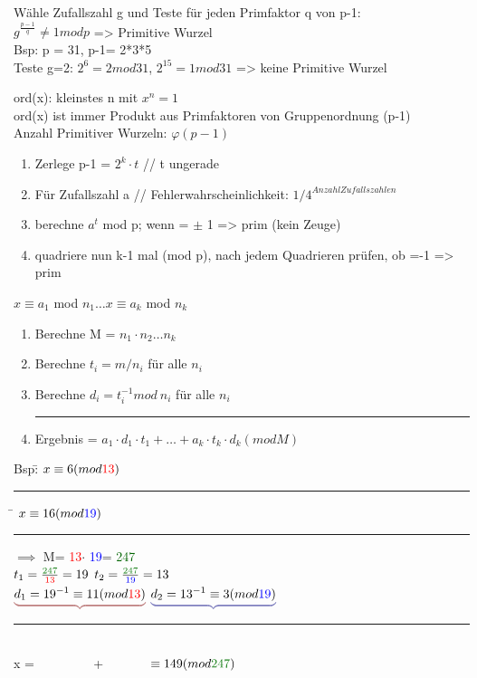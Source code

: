 Wähle Zufallszahl g und Teste für jeden Primfaktor q von p-1: \\
$g^{\frac{p-1}{q}} \neq 1 mod p$ => Primitive Wurzel\\
Bsp: p = 31, p-1= 2*3*5\\
Teste g=2:  $2^6 =2 mod 31$, $2^{15} =1 mod 31$ => keine Primitive Wurzel

ord(x): kleinstes n mit $x^n=1$\\
ord(x) ist immer Produkt aus Primfaktoren von Gruppenordnung (p-1)\\
Anzahl Primitiver Wurzeln: $\varphi(p-1)$\\


\begin{enumerate}
\item Zerlege p-1 = $2^k \cdot t$ // t ungerade
\item Für Zufallszahl a // Fehlerwahrscheinlichkeit: $1/4^{Anzahl Zufallszahlen}$
\item berechne $a^t$ mod p; wenn = $\pm$ 1  => prim (kein Zeuge)
\item quadriere nun k-1 mal (mod p), nach jedem Quadrieren prüfen, ob =-1 => prim
\end{enumerate}



\newcommand{\Neins}{\textcolor{red}{13}}  \newcommand{\Nzwei}{\textcolor{blue}{19}}
\newcommand{\Mod}{\textcolor{darkgreen}{247} }
\newcommand{\colorubrace}[2]{ \textcolor{#1}{\underbrace{\textcolor{black}{#2} }}}
\newcommand{\coloroval}[2]{ \textcolor{#1}{\Ovalbox{\textcolor{black}{#2} }}}


$x \equiv a_1$ mod $n_1 \dots  x \equiv a_k$ mod $ n_k$
\begin{enumerate}
\item Berechne M = $n_1 \cdot n_2 \dots n_k$
\item Berechne $t_i = m / n_i$ für alle $n_i$
\item Berechne $d_i = t_i^{-1} mod~n_i$ für alle $n_i$  \rule{1cm}{0cm} \Euklid
\item Ergebnis = $ a_1 \cdot d_1 \cdot t_1 + \dots + a_k \cdot t_k \cdot d_k  (mod M)$
\end{enumerate}
\begin{tabbing}
Bsp:\= $x \equiv 6 (mod \Neins )$  \rule{1.5cm}{0cm} \=  $x \equiv 16 (mod \Nzwei) $ \rule{1.5cm}{0cm} $\implies$ M= \Neins $\cdot$ \Nzwei = \Mod \\
 \>$t_1 =\frac{\Mod}{\Neins} =19 $ \> $ t_2 = \frac{\Mod}{\Nzwei} =13 $ \\
\>$\colorubrace{red!50!black!50}{d_1 = 19^{-1} \equiv  11 (mod \Neins) }$ \> $\colorubrace{blue!50!black!50}{ d_2 = 13^{-1} \equiv 3 ( mod \Nzwei)}$ \rule{1cm}{0cm} \Euklid \\
\> x =~~~~~ \coloroval{red!50!black!50}{$6 \cdot 19 \cdot 11$ }  ~~~   + \> ~~~~~~\coloroval{blue!50!black!50}{$16 \cdot 13 \cdot 3$} $\equiv 149 (mod \Mod) $  \\
\end{tabbing}






